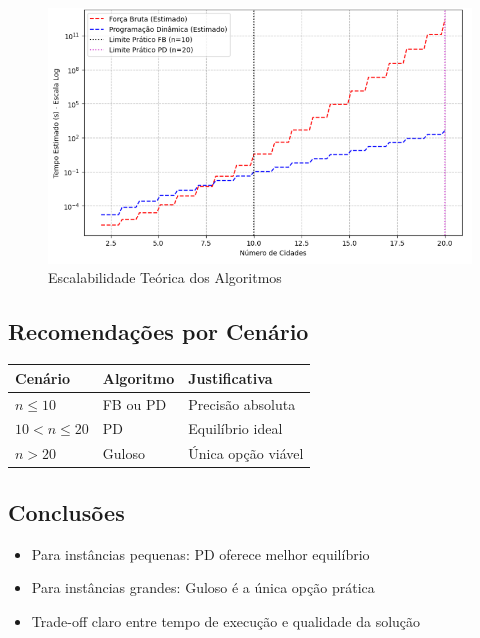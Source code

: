 \begin{itemize}
    \begin{figure}[!htb]
        \centering
        \includegraphics[width=.9\textwidth]{images/escalabilidade.png}
        \caption{Escalabilidade Teórica dos Algoritmos}
        \label{fig:aa}
        \end{figure}
\end{itemize}

\subsection{Recomendações por Cenário}

\begin{table}[H]
\centering
\begin{tabular}{|l|l|l|}
\hline
\textbf{Cenário} & \textbf{Algoritmo} & \textbf{Justificativa} \\
\hline
$n \leq 10$ & FB ou PD & Precisão absoluta \\
$10 < n \leq 20$ & PD & Equilíbrio ideal \\
$n > 20$ & Guloso & Única opção viável \\
\hline
\end{tabular}
\end{table}

\subsection{Conclusões}
\begin{itemize}
\item Para instâncias pequenas: PD oferece melhor equilíbrio
\item Para instâncias grandes: Guloso é a única opção prática
\item Trade-off claro entre tempo de execução e qualidade da solução
\end{itemize}

\nocite{wikipedia_programacao_dinamica}
\nocite{noic_programacao_dinamica}
\nocite{cerveira_tsp}